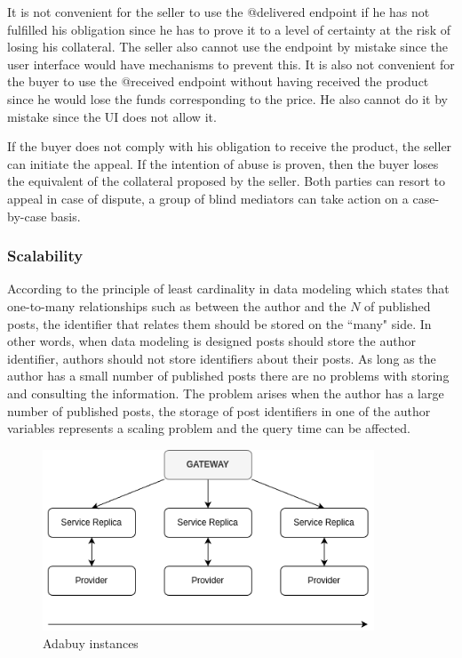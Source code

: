 \documentclass[12pt]{article}
\begin{document}
It is not convenient for the seller to use the @delivered endpoint if he has not fulfilled his obligation since he has to prove it to a level of certainty at the risk of losing his collateral. The seller also cannot use the endpoint by mistake since the user interface would have mechanisms to prevent this. It is also not convenient for the buyer to use the @received endpoint without having received the product since he would lose the funds corresponding to the price. He also cannot do it by mistake since the UI does not allow it.

If the buyer does not comply with his obligation to receive the product, the seller can initiate the appeal. If the intention of abuse is proven, then the buyer loses the equivalent of the collateral proposed by the seller. Both parties can resort to appeal in case of dispute, a group of blind mediators can take action on a case-by-case basis.

\subsubsection { Scalability } 

According to the principle of least cardinality in data modeling which states that one-to-many relationships such as between the author and the $N$ of published posts, the identifier that relates them should be stored on the ``many" side. In other words, when data modeling is designed posts should store the author identifier, authors should not store identifiers about their posts. As long as the author has a small number of published posts there are no problems with storing and consulting the information. The problem arises when the author has a large number of published posts, the storage of post identifiers in one of the author variables represents a scaling problem and the query time can be affected.


\begin{figure}[ht]
  \centering
  \includegraphics[width=0.88\textwidth, keepaspectratio]{scalability.png}
  \caption{Adabuy instances}
  \label{fig:delivered}
\end{figure}
\end{document}
